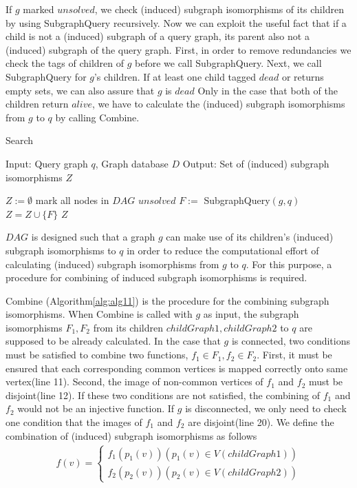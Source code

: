 If $g$ marked $unsolved$, we check (induced) subgraph isomorphisms of its children by using SubgraphQuery recursively.
Now we can exploit the useful fact that if a child is not a (induced) subgraph of a query graph, its parent also not a (induced) subgraph of the query graph.
First, in order to remove redundancies we check the tags of children of $g$ before we call SubgraphQuery. 
Next, we call SubgraphQuery for $g$'s children.
If at least one child tagged $dead$ or returns empty sets, we can also assure that $g$ is $dead$  
Only in the case that both of the children return $alive$, we have to calculate the (induced) subgraph isomorphisms from $g$ to $q$ by calling Combine.

\begin{algorithm}[t]
\caption{Search}
\label{alg:alg4}
\begin{algorithmic}
\STATE Input: Query graph $q$, Graph database $D$
\STATE Output: Set of (induced) subgraph isomorphisms $Z$
\end{algorithmic}
\begin{algorithmic}[1]
\STATE $Z := \emptyset$
\STATE mark all nodes in $DAG$ $unsolved$
	\STATE $F :=$ SubgraphQuery$(g,q)$
		\STATE $Z = Z \cup \{F\}$
	\ENDIF
\ENDFOR
\RETURN $Z$
\end{algorithmic}
\end{algorithm}



$DAG$ is designed such that a graph $g$ can make use of its children's (induced) subgraph isomorphisms to $q$ in order to reduce the computational effort of 
calculating (induced) subgraph isomorphisms from $g$ to $q$. For this purpose, a procedure for combining of induced subgraph isomorphisms is required.

Combine (Algorithm\ref{alg:alg11}) is the procedure for the combining subgraph isomorphisms. When Combine is called with $g$ as input, the subgraph 
isomorphisms $F_1, F_2$ from its children $childGraph1, childGraph2$ to $q$ are supposed to be already calculated.
In the case that $g$ is connected, two conditions must be satisfied to combine two functions, $f_1 \in F_1, f_2 \in F_2$.
First, it must be ensured that each corresponding common vertices is mapped correctly onto same vertex(line 11).
Second, the image of non-common vertices of $f_1$ and $f_2$ must be disjoint(line 12).
If these two conditions are not satisfied, the combining of $f_1$ and $f_2$ would not be an injective function.
If $g$ is disconnected, we only need to check one condition that the images of $f_1$ and $f_2$ are disjoint(line 20).
We define the combination of (induced) subgraph isomorphisms as follows
\begin{eqnarray}
\label{eq:eq1}
f(v) = \left\{
\begin{array}{l}
f_1(p_1(v)) (p_1(v) \in V(childGraph1))\\
f_2(p_2(v)) (p_2(v) \in V(childGraph2))
\end{array}
\right.
\end{eqnarray}
 
